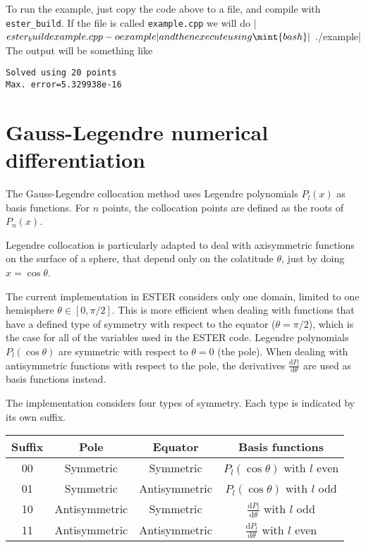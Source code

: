 To run the example, just copy the code above to a file, and compile with \texttt{ester\_build}. 
If the file is called \texttt{example.cpp} we will do
|$ ester_build example.cpp -o example|     %
and then execute using
\mint{bash}|$ ./example|     %
The output will be something like
\begin{verbatim}
Solved using 20 points
Max. error=5.329938e-16
\end{verbatim}


\section{Gauss-Legendre numerical differentiation}

The Gauss-Legendre collocation method uses Legendre polynomials $P_l(x)$ as basis functions.
For $n$ points, the collocation points are defined as the roots of $P_n(x)$.

Legendre collocation is particularly adapted to deal with axisymmetric functions on the surface
of a sphere, that depend only on the colatitude $\theta$, just by doing $x=\cos\theta$.

The current implementation in ESTER considers only one domain, limited to one hemisphere $\theta\in[0,\pi/2]$.
This is more efficient when dealing with functions that have a defined type of symmetry 
with respect to the equator ($\theta=\pi/2$),
 which is the case for all of the variables used in the ESTER code. 
Legendre polynomials $P_l(\cos\theta)$ are symmetric with respect to $\theta=0$ (the pole). When
dealing with antisymmetric functions with respect to the pole, the derivatives 
$\frac{\mathrm{d}P_l}{\mathrm{d}\theta}$ are used as basis functions instead.

The implementation considers four types of symmetry. Each type is indicated by its own suffix.

\medskip

\begin{tabular}{cccc}
Suffix& Pole &Equator&Basis functions\\
\hline
00&Symmetric&Symmetric&$P_l(\cos\theta)$ with $l$ even \\
01&Symmetric&Antisymmetric&$P_l(\cos\theta)$ with $l$ odd\\
10&Antisymmetric&Symmetric&$\frac{\mathrm{d}P_l}{\mathrm{d}\theta}$ with $l$ odd\\
11&Antisymmetric&Antisymmetric&$\frac{\mathrm{d}P_l}{\mathrm{d}\theta}$ with $l$ even\\
\end{tabular}

